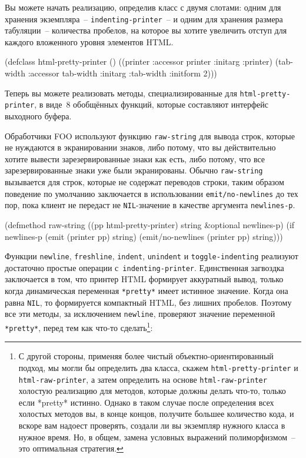 Вы можете начать реализацию, определив класс с двумя слотами: одним для хранения
экземпляра~-- \lstinline{indenting-printer}~-- и одним для хранения размера табуляции~--
количества пробелов, на которое вы хотите увеличить отступ для каждого вложенного уровня
элементов HTML.

\begin{myverb}
(defclass html-pretty-printer ()
  ((printer   :accessor printer   :initarg :printer)
   (tab-width :accessor tab-width :initarg :tab-width :initform 2)))
\end{myverb}

Теперь вы можете реализовать методы, специализированные для \lstinline{html-pretty-printer}, в
виде~8 обобщённых функций, которые составляют интерфейс выходного буфера.

Обработчики FOO используют функцию \lstinline{raw-string} для вывода строк, которые не
нуждаются в экранировании знаков, либо потому, что вы действительно хотите вы\-вес\-ти
зарезервированные знаки как есть, либо потому, что все зарезервированные знаки уже были
экранированы. Обычно \lstinline{raw-string} вызывается для строк, которые не содержат переводов
строки, таким образом поведение по умолчанию заключается в использовании
\lstinline{emit/no-newlines} до тех пор, пока клиент не передаст не \lstinline{NIL}-значение в
качестве аргумента \lstinline{newlines-p}.

\begin{myverb}
(defmethod raw-string ((pp html-pretty-printer) string &optional newlines-p)
  (if newlines-p
    (emit (printer pp) string)
    (emit/no-newlines (printer pp) string)))
\end{myverb}

Функции \lstinline{newline}, \lstinline{freshline}, \lstinline{indent},
\lstinline{unindent} и \lstinline{toggle-indenting} реализуют достаточно простые операции
с~\lstinline{indenting-printer}. Единственная загвоздка заключается в том, что принтер
HTML формирует аккуратный вывод, только когда динамическая переменная \lstinline{*pretty*}
имеет истинное значение. Когда она равна \lstinline{NIL}, то формируется компактный HTML,
без лишних пробелов. Поэтому все эти методы, за исключением \lstinline{newline}, проверяют
значение переменной \lstinline{*pretty*}, перед тем как что-то сделать\footnote{С другой
  стороны, применяя более чистый объектно-ориентированный подход, мы могли бы определить
  два класса, скажем \lstinline{html-pretty-printer} и \lstinline{html-raw-printer}, а
  затем определить на основе \lstinline{html-raw-printer} холостую реализацию для методов,
  которые должны делать что-то, только если *pretty* истинно. Однако в таком случае после
  определения всех холостых методов вы, в конце концов, получите большее количество кода,
  и вскоре вам надоест проверять, создали ли вы экземпляр нужного класса в нужное
  время. Но, в общем, замена условных выражений полиморфизмом~-- это оптимальная
  стратегия.}\hspace{\footnotenegspace}:

